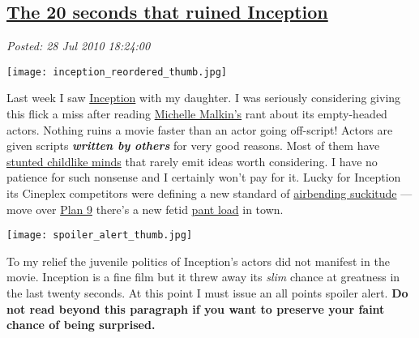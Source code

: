 %

\subsection*{\href{http://bakerjd99.wordpress.com/2010/07/28/the-20-seconds-that-ruined-inception/}{The 20 seconds that ruined Inception}}


\noindent\emph{Posted: 28 Jul 2010 18:24:00}
\vspace{6pt}


\captionsetup[floatingfigure]{labelformat=empty}
\begin{floatingfigure}[l]{0.21\textwidth}
\centering
\texttt{[image: inception\_reordered\_thumb.jpg]}
\label{fig:696X0}
\end{floatingfigure}Last week I saw
\href{http://www.rottentomatoes.com/m/inception/}{Inception} with my
daughter. I was seriously considering giving this flick a miss after
reading
\href{http://michellemalkin.com/2010/07/17/if-you-miss-just-one-movie-this-year-make-it-inception/}{Michelle
Malkin's} rant about its empty-headed actors. Nothing ruins a movie
faster than an actor going off-script! Actors are given scripts
\textbf{\emph{written by others}} for very good reasons. Most of them
have
\href{http://www.huffingtonpost.com/jim-carrey/the-judgment-on-vaccines\_b\_189777.html}{stunted
childlike minds} that rarely emit ideas worth considering. I have no
patience for such nonsense and I certainly won't pay for it. Lucky for
Inception its Cineplex competitors were defining a new standard of
\href{http://www.rottentomatoes.com/m/last\_airbender/}{airbending
suckitude} --- move over
\href{http://en.wikipedia.org/wiki/Plan\_9\_from\_Outer\_Space}{Plan 9}
there's a new fetid
\href{http://www.doubletongued.org/index.php/dictionary/pant\_load/}{pant
load} in town.




\begin{floatingfigure}[r]{0.25\textwidth}
\centering
\texttt{[image: spoiler\_alert\_thumb.jpg]}
\label{fig:696X1}
\end{floatingfigure}To my relief the juvenile politics of Inception's actors did not
manifest in the movie. Inception is a fine film but it threw away its
\emph{slim} chance at greatness in the last twenty seconds. At this
point I must issue an all points spoiler alert. \textbf{Do not read
beyond this paragraph if you want to preserve your faint chance of being
surprised.}

